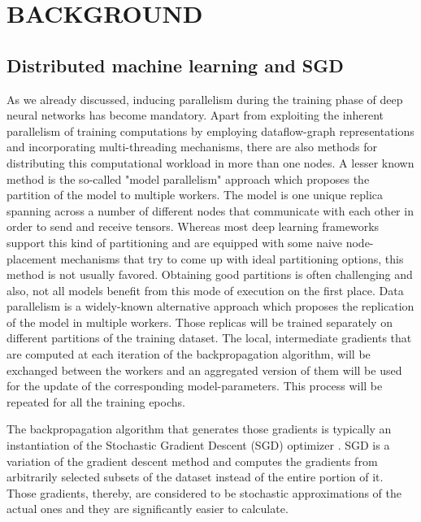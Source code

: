 \chapter{BACKGROUND}
    \section{Distributed machine learning and SGD}
    
    As we already discussed, inducing parallelism during the training phase of deep neural networks has become mandatory.
    Apart from exploiting the inherent parallelism of training computations by employing dataflow-graph representations and incorporating multi-threading mechanisms, there are also methods for distributing this computational workload in more than one nodes.
    A lesser known method is the so-called "model parallelism" approach
    which proposes the partition of the model to multiple workers.
    The model is one unique replica spanning across a number of different nodes that
    communicate with each other in order to send and receive tensors.
    Whereas most deep learning frameworks support this kind of partitioning and are equipped with some naive node-placement mechanisms that try to come up with ideal partitioning options, this method is not usually favored. Obtaining good partitions is often challenging and also, not all models benefit from this mode of execution on the first place.
    Data parallelism is a widely-known alternative approach which proposes the replication of the model in multiple workers. Those replicas will be trained separately on different partitions of the training dataset. 
    The local, intermediate gradients that are computed at each iteration of the backpropagation algorithm, will be exchanged between the workers and an aggregated version of them will be used for the update of the corresponding model-parameters.
    This process will be repeated for all the training epochs.
    
    The backpropagation algorithm that generates those gradients is typically an instantiation of the Stochastic Gradient Descent (SGD) optimizer \cite{robbins1951}.
    SGD is a variation of the gradient descent method and computes the gradients from arbitrarily selected subsets of the dataset instead of the entire portion of it.
    Those gradients, thereby, are considered to be stochastic approximations of the actual ones and they are significantly easier to calculate.
    
